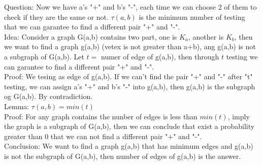 \documentclass[12pt,a4paper]{article}
\begin{document}
Question:
Now we have a's "+" and b's "-", each time we can choose 2 of them to check if they are the same or not.  $\tau(a,b)$ is the minimum number of testing that we can garantee to find a different pair "+" and "-".  \\


Idea:
Consider a graph G(a,b) contains two part, one is $K_a$, another is $K_b$, then we want to find a graph g(a,b) (vetex is not greater than a+b), ang g(a,b) is not a subgraph of G(a,b). Let $t =$ numer of edge of g(a,b), then through  $t$ testing we can   garantee to find a different pair "+" and "-".  \\

Proof:
We tesing as edge of g(a,b). If we can't find the pair "+" and "-" after "t" testing, we can assign a's "+" and b's "-" into g(a,b),  then g(a,b) is the subgraph og G(a,b). By contradiction. \\

Lemma:
 $\tau(a,b)= min(t)$ \\

Proof:
For any graph contains the nunber of edges is less than $min(t)$, imply the graph is a subgraph of G(a,b), then we can conclude that exist a probability greater than 0 that we can not  find a different pair "+" and "-".  \\

Conclusion:
We  want to find a graph g(a,b) that has minimum edges and g(a,b) is not the subgraph of G(a,b), then number of edges of g(a,b) is the answer. \\ 
\end{document}

